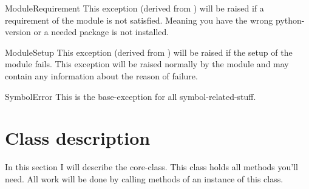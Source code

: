 \begin{excclassdesc}{ModuleRequirement}{}
This exception (derived from ) will be raised if a 
requirement of the module is not satisfied. Meaning you have the wrong 
python-version or a needed package is not installed. 
\end{excclassdesc}

\begin{excclassdesc}{ModuleSetup}{}
This exception (derived from ) will be raised if the
setup of the module fails. This exception will be raised normally by the 
module and may contain any information about the reason of failure.
\end{excclassdesc}

\begin{excclassdesc}{SymbolError}{}
This is the base-exception for all symbol-related-stuff. 
\end{excclassdesc}


\section{Class description}
In this section I will describe the core-class. This class holds all methods
you'll need. All work will be done by calling methods of an instance of this
class.

